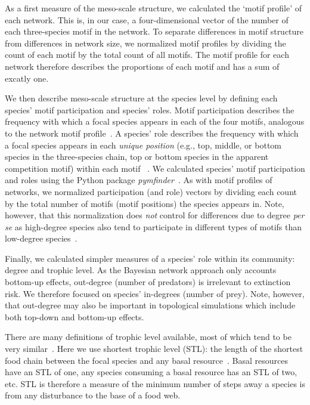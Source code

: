 \documentclass[12pt]{article}
\begin{document}
\begin{spacing}{2.0}
        As a first measure of the meso-scale structure, we calculated the `motif profile' of each network.
        This is, in our case, a four-dimensional vector of the number of each three-species motif in the network.
        To separate differences in motif structure from differences in network size, we normalized motif profiles by dividing the count of each motif by the total count of all motifs.
        The motif profile for each network therefore describes the proportions of each motif and has a sum of excatly one.

    
        We then describe meso-scale structure at the species level by defining each species' motif participation and species' roles.
        Motif participation describes the frequency with which a focal species appears in each of the four motifs, analogous to the network motif profile~\citep{Stouffer2012}.
        A species' role describes the frequency with which a focal species appears in each \emph{unique position} (e.g., top, middle, or bottom species in the three-species chain, top or bottom species in the apparent competition motif) within each motif ~\citep{Stouffer2012,Cirtwill2017}.
		We calculated species' motif participation and roles using the Python package \emph{pymfinder}~\citep{pymfinder}.
        As with motif profiles of networks, we normalized participation (and role) vectors by dividing each count by the total number of motifs (motif positions) the species appears in.
        Note, however, that this normalization does \emph{not} control for differences due to degree \emph{per se} as high-degree species also tend to participate in different types of motifs than low-degree species~\citep{Cirtwill2021_inprep}.
        
        
        Finally, we calculated simpler measures of a species' role within its community: degree and trophic level.
		As the Bayesian network approach only accounts  bottom-up effects, out-degree (number of predators) is irrelevant to extinction risk.
		We therefore focused on species' in-degrees (number of prey).
		Note, however, that out-degree may also be important in topological simulations which include both top-down and bottom-up effects. 


		There are many definitions of trophic level available, most of which tend to be very similar~\citep{Carscallen2012}.
		Here we use shortest trophic level (STL): the length of the shortest food chain between the focal species and any basal resource~\citep{Williams2004}. 
		Basal resources have an STL of one, any species consuming a basal resource has an STL of two, etc.
        STL is therefore a measure of the minimum number of steps away a species is from any disturbance to the base of a food web.



\end{spacing}
\end{document}
